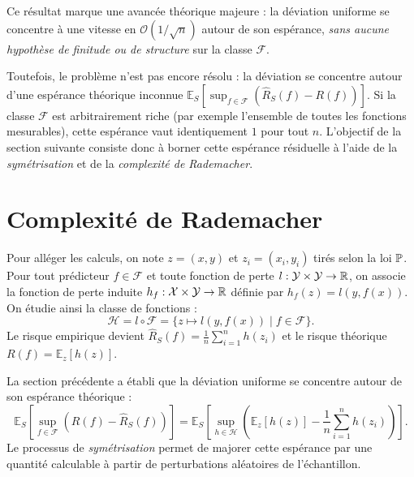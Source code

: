 \begin{remark}
    Ce résultat marque une avancée théorique majeure : la déviation uniforme se concentre à une vitesse en $\mathcal{O}(1/\sqrt{n})$ autour de son espérance, \emph{sans aucune hypothèse de finitude ou de structure} sur la classe $\mathcal{F}$.
    
    Toutefois, le problème n'est pas encore résolu : la déviation se concentre autour d'une espérance théorique inconnue $\mathbb{E}_S\left[ \sup_{f \in \mathcal{F}} (\hat{R}_S(f) - R(f)) \right]$. Si la classe $\mathcal{F}$ est arbitrairement riche (par exemple l'ensemble de toutes les fonctions mesurables), cette espérance vaut identiquement $1$ pour tout $n$. L'objectif de la section suivante consiste donc à borner cette espérance résiduelle à l'aide de la \emph{symétrisation} et de la \emph{complexité de Rademacher}.
\end{remark}



\section{Complexité de Rademacher}

\begin{notation}
    Pour alléger les calculs, on note $z = (x,y)$ et $z_i = (x_i, y_i)$ tirés selon la loi $\mathbb{P}$. Pour tout prédicteur $f \in \mathcal{F}$ et toute fonction de perte $l : \mathcal{Y} \times \mathcal{Y} \to \mathbb{R}$, on associe la fonction de perte induite $h_f : \mathcal{X} \times \mathcal{Y} \to \mathbb{R}$ définie par $h_f(z) = l(y, f(x))$. On étudie ainsi la classe de fonctions :
    \begin{equation}
        \mathcal{H} = l \circ \mathcal{F} = \{ z \mapsto l(y, f(x)) \mid f \in \mathcal{F} \}. 
    \end{equation}
    Le risque empirique devient $\hat{R}_S(f) = \frac{1}{n} \sum_{i=1}^n h(z_i)$ et le risque théorique $R(f) = \mathbb{E}_z[h(z)]$.
\end{notation}

La section précédente a établi que la déviation uniforme se concentre autour de son espérance théorique :
\begin{equation}
    \mathbb{E}_S \left[ \sup_{f \in \mathcal{F}} (R(f) - \hat{R}_S(f)) \right] = \mathbb{E}_S \left[ \sup_{h \in \mathcal{H}} \left( \mathbb{E}_z[h(z)] - \frac{1}{n} \sum_{i=1}^n h(z_i) \right) \right].
\end{equation}
Le processus de \emph{symétrisation} permet de majorer cette espérance par une quantité calculable à partir de perturbations aléatoires de l'échantillon.

